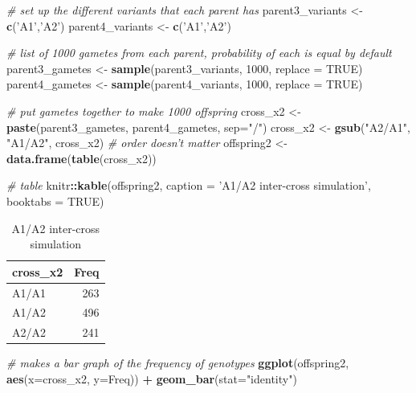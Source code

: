 \documentclass[]{book}
\newenvironment{Shaded}{\begin{snugshade}}{\end{snugshade}}
\newcommand{\KeywordTok}[1]{\textcolor[rgb]{0.13,0.29,0.53}{\textbf{#1}}}
\newcommand{\DataTypeTok}[1]{\textcolor[rgb]{0.13,0.29,0.53}{#1}}
\newcommand{\DecValTok}[1]{\textcolor[rgb]{0.00,0.00,0.81}{#1}}
\newcommand{\StringTok}[1]{\textcolor[rgb]{0.31,0.60,0.02}{#1}}
\newcommand{\CommentTok}[1]{\textcolor[rgb]{0.56,0.35,0.01}{\textit{#1}}}
\newcommand{\OtherTok}[1]{\textcolor[rgb]{0.56,0.35,0.01}{#1}}
\newcommand{\OperatorTok}[1]{\textcolor[rgb]{0.81,0.36,0.00}{\textbf{#1}}}
\newcommand{\NormalTok}[1]{#1}
\theoremstyle{definition}
\theoremstyle{definition}
\theoremstyle{definition}
\theoremstyle{remark}
\begin{document}
\begin{Shaded}
\begin{Highlighting}[]
\CommentTok{# set up the different variants that each parent has}
\NormalTok{parent3_variants <-}\StringTok{ }\KeywordTok{c}\NormalTok{(}\StringTok{'A1'}\NormalTok{,}\StringTok{'A2'}\NormalTok{)}
\NormalTok{parent4_variants <-}\StringTok{ }\KeywordTok{c}\NormalTok{(}\StringTok{'A1'}\NormalTok{,}\StringTok{'A2'}\NormalTok{)}

\CommentTok{# list of 1000 gametes from each parent, probability of each is equal by default}
\NormalTok{parent3_gametes <-}\StringTok{ }\KeywordTok{sample}\NormalTok{(parent3_variants, }\DecValTok{1000}\NormalTok{, }\DataTypeTok{replace =} \OtherTok{TRUE}\NormalTok{)}
\NormalTok{parent4_gametes <-}\StringTok{ }\KeywordTok{sample}\NormalTok{(parent4_variants, }\DecValTok{1000}\NormalTok{, }\DataTypeTok{replace =} \OtherTok{TRUE}\NormalTok{)}

\CommentTok{# put gametes together to make 1000 offspring}
\NormalTok{cross_x2 <-}\StringTok{ }\KeywordTok{paste}\NormalTok{(parent3_gametes, parent4_gametes, }\DataTypeTok{sep=}\StringTok{"/"}\NormalTok{)}
\NormalTok{cross_x2 <-}\StringTok{ }\KeywordTok{gsub}\NormalTok{(}\StringTok{"A2/A1"}\NormalTok{, }\StringTok{"A1/A2"}\NormalTok{, cross_x2) }\CommentTok{# order doesn't matter}
\NormalTok{offspring2 <-}\StringTok{ }\KeywordTok{data.frame}\NormalTok{(}\KeywordTok{table}\NormalTok{(cross_x2))}

\CommentTok{# table}
\NormalTok{knitr}\OperatorTok{::}\KeywordTok{kable}\NormalTok{(offspring2, }\DataTypeTok{caption =} \StringTok{'A1/A2 inter-cross simulation'}\NormalTok{, }\DataTypeTok{booktabs =} \OtherTok{TRUE}\NormalTok{)}
\end{Highlighting}
\end{Shaded}

\begin{table}

\caption{\label{tab:unnamed-chunk-11}A1/A2 inter-cross simulation}
\centering
\begin{tabular}[t]{lr}
\toprule
cross\_x2 & Freq\\
\midrule
A1/A1 & 263\\
A1/A2 & 496\\
A2/A2 & 241\\
\bottomrule
\end{tabular}
\end{table}

\begin{Shaded}
\begin{Highlighting}[]
\CommentTok{# makes a bar graph of the frequency of genotypes}
\KeywordTok{ggplot}\NormalTok{(offspring2, }\KeywordTok{aes}\NormalTok{(}\DataTypeTok{x=}\NormalTok{cross_x2, }\DataTypeTok{y=}\NormalTok{Freq)) }\OperatorTok{+}\StringTok{ }\KeywordTok{geom_bar}\NormalTok{(}\DataTypeTok{stat=}\StringTok{"identity"}\NormalTok{)}
\end{Highlighting}
\end{Shaded}
\end{document}
